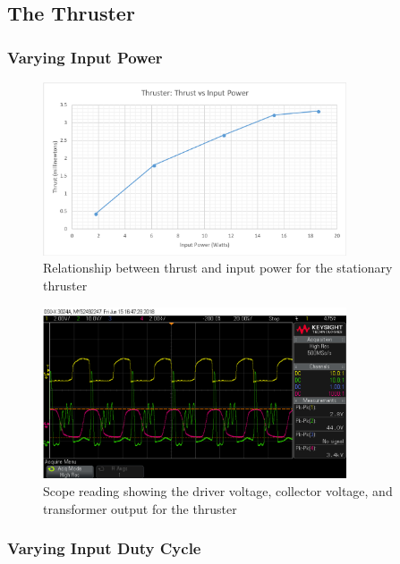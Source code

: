 \documentclass[11pt]{article}
\begin{document}
\subsection{The Thruster}

\subsubsection{Varying Input Power}

\begin{figure}[h!]
\centering
\includegraphics[width = 0.8\textwidth]{thruster_g1}
\caption{\label{fig:thruster_g1} Relationship between thrust and input power for the stationary thruster}
\end{figure}

\begin{figure}[h!]
\centering
\includegraphics[width = 0.8\textwidth]{thruster_sc_1}
\caption{\label{fig:thruster_sc_1} Scope reading showing the driver voltage, collector voltage, and transformer output for the thruster}
\end{figure}


\pagebreak
\subsubsection{Varying Input Duty Cycle}
\end{document}
